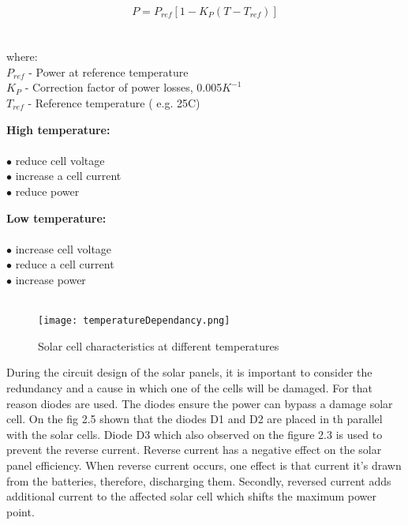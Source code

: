 \begin{equation}
P = P_{ref} [ 1 - K_{P} ( T - T_{ref}) ]
\end{equation}
	\\
	\\
where:\\
     $P_{ref}$ - Power at reference temperature\\
     $K_{P}$ - Correction factor of power losses, 0.005$K^{-1}$\\
     $T_{ref}$ - Reference temperature ( e.g. 25\textdegree{}C)\\
     
     

\begin{multicols}{2}
	\textbf{High  temperature:} \\ \\
	$\bullet$ reduce cell voltage \\
	$\bullet$ increase a cell current\\
	$\bullet$ reduce power\\
	

	\columnbreak
	
	\textbf{Low temperature:}\\ \\
	$\bullet$ increase cell voltage\\
	$\bullet$ reduce a cell current\\
	$\bullet$ increase power\\
	\\
\end{multicols}


	\begin{figure}[h]
		\centering
		\texttt{[image: temperatureDependancy.png]}
		\caption{ Solar cell characteristics at different temperatures\cite{6} }
		\label{fig: EPS}
	\end{figure}

During the circuit design of the solar panels, it is important to consider the redundancy and a cause in which one of the cells will be damaged. For that reason diodes are used. The diodes ensure the power can bypass a damage solar cell. On the fig 2.5 shown that the diodes D1 and D2 are placed in th parallel with the solar cells. Diode D3 which also observed on the figure 2.3 is used to prevent the reverse current. Reverse current has a negative effect on the solar panel efficiency. When reverse current occurs, one effect is that current it's drawn from the batteries, therefore, discharging them. Secondly, reversed current adds additional current to the affected solar cell which shifts the maximum power point.

